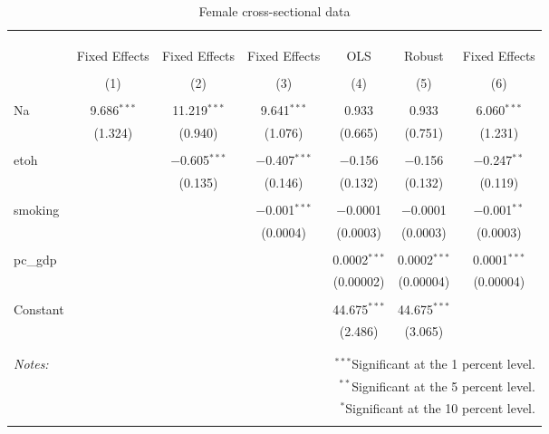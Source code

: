 \documentclass[11pt]{article}\usepackage[]{graphicx}\usepackage[]{color}
\begin{document}
\begin{table}[!htbp] \centering 
  \caption{Female cross-sectional data} 
  \label{tab:ffe} 
\begin{tabular}{@{\extracolsep{5pt}}lcccccc} 
\\[-1.8ex]\hline 
\hline \\[-1.8ex] 
\\[-1.8ex] & \multicolumn{6}{c}{ } \\ 
 & Fixed Effects & Fixed Effects & Fixed Effects & OLS & Robust & Fixed Effects \\ 
\\[-1.8ex] & (1) & (2) & (3) & (4) & (5) & (6)\\ 
\hline \\[-1.8ex] 
 Na & 9.686$^{***}$ & 11.219$^{***}$ & 9.641$^{***}$ & 0.933 & 0.933 & 6.060$^{***}$ \\ 
  & (1.324) & (0.940) & (1.076) & (0.665) & (0.751) & (1.231) \\ 
  & & & & & & \\ 
 etoh &  & $-$0.605$^{***}$ & $-$0.407$^{***}$ & $-$0.156 & $-$0.156 & $-$0.247$^{**}$ \\ 
  &  & (0.135) & (0.146) & (0.132) & (0.132) & (0.119) \\ 
  & & & & & & \\ 
 smoking &  &  & $-$0.001$^{***}$ & $-$0.0001 & $-$0.0001 & $-$0.001$^{**}$ \\ 
  &  &  & (0.0004) & (0.0003) & (0.0003) & (0.0003) \\ 
  & & & & & & \\ 
 pc\_gdp &  &  &  & 0.0002$^{***}$ & 0.0002$^{***}$ & 0.0001$^{***}$ \\ 
  &  &  &  & (0.00002) & (0.00004) & (0.00004) \\ 
  & & & & & & \\ 
 Constant &  &  &  & 44.675$^{***}$ & 44.675$^{***}$ &  \\ 
  &  &  &  & (2.486) & (3.065) &  \\ 
  & & & & & & \\ 
\hline 
\hline \\[-1.8ex] 
\textit{Notes:} & \multicolumn{6}{r}{$^{***}$Significant at the 1 percent level.} \\ 
 & \multicolumn{6}{r}{$^{**}$Significant at the 5 percent level.} \\ 
 & \multicolumn{6}{r}{$^{*}$Significant at the 10 percent level.} \\ 
 & \multicolumn{6}{r}{} \\ 
\end{tabular} 
\end{table} 
\end{document}
